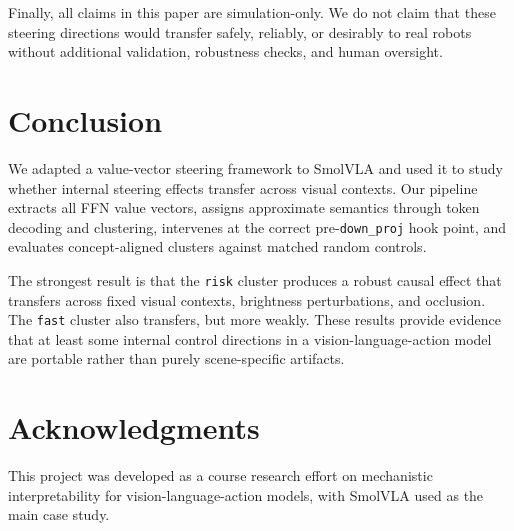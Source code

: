 \documentclass[11pt]{article}
\begin{document}
Finally, all claims in this paper are simulation-only. We do not claim that these steering directions would transfer safely, reliably, or desirably to real robots without additional validation, robustness checks, and human oversight.

\section{Conclusion}

We adapted a value-vector steering framework \citep{haon2025mechanistic} to SmolVLA \citep{shukor2025smolvla} and used it to study whether internal steering effects transfer across visual contexts. Our pipeline extracts all FFN value vectors, assigns approximate semantics through token decoding and clustering, intervenes at the correct pre-\texttt{down\_proj} hook point, and evaluates concept-aligned clusters against matched random controls.

The strongest result is that the \texttt{risk} cluster produces a robust causal effect that transfers across fixed visual contexts, brightness perturbations, and occlusion. The \texttt{fast} cluster also transfers, but more weakly. These results provide evidence that at least some internal control directions in a vision-language-action model are portable rather than purely scene-specific artifacts.

\section*{Acknowledgments}

This project was developed as a course research effort on mechanistic interpretability for vision-language-action models, with SmolVLA used as the main case study.


\end{document}

